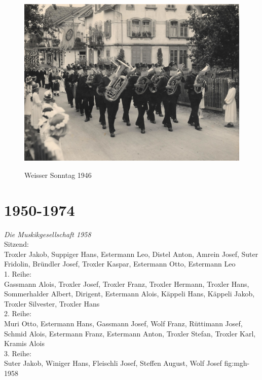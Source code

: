 \documentclass[]{book}
\begin{document}
\begin{figure}[ht]
    \centering
    \includegraphics{./chap/1925-1950/Weisser-Sontag-1946.jpg}
    \label{fig:mgh-weisssontag-prozession}
    \caption{Weisser Sonntag 1946}
\end{figure}
\clearpage

\section{1950-1974}

{\emph{Die Muskikgesellschaft 1958}\\
    Sitzend:\\
    Troxler Jakob, Suppiger Hans, Estermann Leo, Distel Anton, Amrein Josef,
    Suter Fridolin, Bründler Josef, Troxler Kaspar, Estermann Otto, Estermann
    Leo\\
    1. Reihe:\\
    Gassmann Alois, Troxler Josef, Troxler Franz, Troxler Hermann, Troxler Hans,
    Sommerhalder Albert, Dirigent, Estermann Alois, Käppeli Hans, Käppeli Jakob,
    Troxler Silvester, Troxler Hans\\
    2. Reihe:\\
    Muri Otto, Estermann Hans, Gassmann Josef, Wolf Franz, Rüttimann Josef,
    Schmid Alois, Estermann Franz, Estermann Anton, Troxler Stefan, Troxler
    Karl, Kramis Alois\\
    3. Reihe:\\
    Suter Jakob, Winiger Hans, Fleischli Josef, Steffen August, Wolf Josef }
{fig:mgh-1958}
\end{document}
